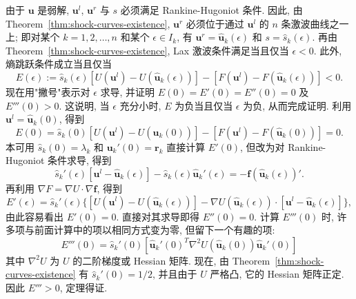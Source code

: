 \begin{Proof}
由于 $\bm{u}$ 是弱解, $\bm{u}^l$, $\bm{u}^r$ 与 $s$ 必须满足 Rankine-Hugoniot 条件. 因此, 由 Theorem~\ref{thm:shock-curves-existence}, $\bm{u}^r$ 必须位于通过 $\bm{u}^l$ 的 $n$ 条激波曲线之一上; 即对某个 $k=1,2,\ldots,n$ 和某个 $\epsilon\in I_k$, 有 $\bm{u}^r=\hat{\bm{u}}_k(\epsilon)$ 和 $s=\hat s_k(\epsilon)$. 再由 Theorem~\ref{thm:shock-curves-existence}, Lax 激波条件满足当且仅当 $\epsilon<0$. 此外, 熵跳跃条件成立当且仅当
\begin{equation}\label{eq:entropy-shock-curve-functional}
E(\epsilon):=\hat s_k(\epsilon)[U(\bm{u}^l)-U(\hat{\bm{u}}_k(\epsilon))]-[F(\bm{u}^l)-F(\hat{\bm{u}}_k(\epsilon))]<0.
\end{equation}
现在用"撇号"表示对 $\epsilon$ 求导, 并证明 $E(0)=E'(0)=E''(0)=0$ 及 $E'''(0)>0$. 这说明, 当 $\epsilon$ 充分小时, $E$ 为负当且仅当 $\epsilon$ 为负, 从而完成证明. 利用 $\bm{u}^l=\hat{\bm{u}}_k(0)$, 得到
\begin{equation}\label{eq:entropy-shock-functional-at-zero}
E(0)=\hat s_k(0)[U(\bm{u}^l)-U(\hat{\bm{u}}_k(0))]-[F(\bm{u}^l)-F(\hat{\bm{u}}_k(0))]=0.
\end{equation}
本可用 $\hat s_k(0)=\lambda_k$ 和 $\bm{u}_k'(0)=\bm{r}_k$ 直接计算 $E'(0)$, 但改为对 Rankine-Hugoniot 条件求导, 得到
\begin{equation}\label{eq:shock-rh-parameter-derivative}
\hat s_k'(\epsilon)[\bm{u}^l-\hat{\bm{u}}_k(\epsilon)]-\hat s_k(\epsilon)\hat{\bm{u}}_k'(\epsilon)=-\bm{f}(\hat{\bm{u}}_k(\epsilon))'.
\end{equation}
再利用 $\nabla F=\nabla U\cdot\nabla\bm{f}$, 得到
\begin{equation}\label{eq:entropy-shock-functional-first-derivative}
E'(\epsilon)=\hat s_k'(\epsilon)\{[U(\bm{u}^l)-U(\hat{\bm{u}}_k(\epsilon))]-\nabla U(\hat{\bm{u}}_k(\epsilon))\cdot[\bm{u}^l-\hat{\bm{u}}_k(\epsilon)]\},
\end{equation}
由此容易看出 $E'(0)=0$. 直接对其求导即得 $E''(0)=0$. 计算 $E'''(0)$ 时, 许多项与前面计算中的项以相同方式变为零, 但留下一个有趣的项:
\begin{equation}\label{eq:entropy-shock-functional-third-derivative}
E'''(0)=\hat s_k'(0)[\hat{\bm{u}}_k'(0)^T\nabla^2U(\hat{\bm{u}}_k(0))\hat{\bm{u}}_k'(0)]
\end{equation}
其中 $\nabla^2U$ 为 $U$ 的二阶梯度或 Hessian 矩阵. 现在, 由 Theorem~\ref{thm:shock-curves-existence} 有 $\hat s_k'(0)=1/2$, 并且由于 $U$ 严格凸, 它的 Hessian 矩阵正定. 因此 $E'''>0$, 定理得证.
\end{Proof}

